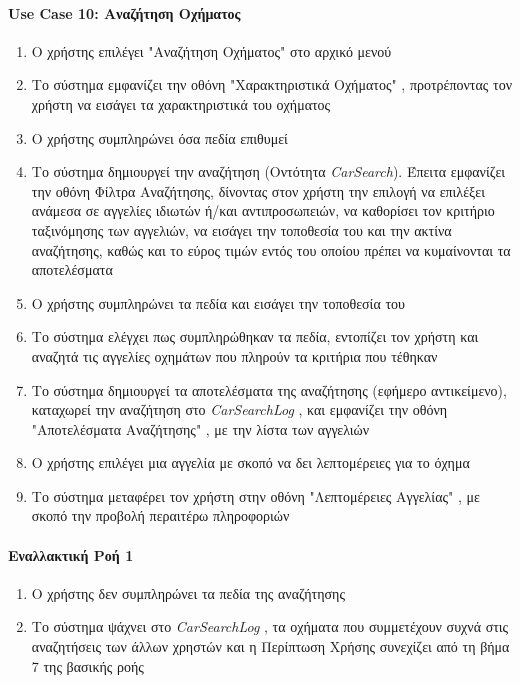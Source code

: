 \documentclass{../ol-softwaremanual}
\begin{document}
	\paragraph{\en Use Case 10: \gr Αναζήτηση Οχήματος}  
	\begin{enumerate}
		\item Ο χρήστης επιλέγει \en"\gr Αναζήτηση Οχήματος\en" \gr στο αρχικό μενού
		\item Το σύστημα εμφανίζει την οθόνη \en"\gr Χαρακτηριστικά Οχήματος\en" \gr, προτρέποντας τον χρήστη να εισάγει τα χαρακτηριστικά του οχήματος 
		\item Ο χρήστης συμπληρώνει όσα πεδία επιθυμεί
		\item Το σύστημα δημιουργεί την αναζήτηση (Οντότητα \en \textit{CarSearch}\gr). Έπειτα εμφανίζει την οθόνη Φίλτρα Αναζήτησης, δίνοντας στον χρήστη την επιλογή να επιλέξει ανάμεσα σε αγγελίες ιδιωτών ή/και αντιπροσωπειών, να καθορίσει τον κριτήριο ταξινόμησης των αγγελιών, να εισάγει την τοποθεσία του και την ακτίνα αναζήτησης, καθώς και το εύρος τιμών εντός του οποίου πρέπει να κυμαίνονται τα αποτελέσματα
		\item Ο χρήστης συμπληρώνει τα πεδία και εισάγει την τοποθεσία του 
		\item Το σύστημα ελέγχει πως συμπληρώθηκαν τα πεδία, εντοπίζει τον χρήστη και αναζητά τις αγγελίες οχημάτων που πληρούν τα κριτήρια που τέθηκαν		
		\item Το σύστημα δημιουργεί τα αποτελέσματα της αναζήτησης (εφήμερο αντικείμενο), καταχωρεί την αναζήτηση στο \en \textit{CarSearchLog} \gr, και εμφανίζει την οθόνη \en"\gr Αποτελέσματα Αναζήτησης\en" \gr, με την λίστα των αγγελιών 
		\item Ο χρήστης επιλέγει μια αγγελία με σκοπό να δει λεπτομέρειες για το όχημα
		\item Το σύστημα μεταφέρει τον χρήστη στην οθόνη \en"\gr Λεπτομέρειες Αγγελίας\en" \gr, με σκοπό την προβολή περαιτέρω πληροφοριών	
	\end{enumerate}
	
	
	\paragraph{Εναλλακτική Ροή 1}
	\begin{enumerate}
			\item Ο χρήστης δεν συμπληρώνει τα πεδία της αναζήτησης
			\item Το σύστημα ψάχνει στο \en \textit{CarSearchLog} \gr, τα οχήματα που συμμετέχουν συχνά στις αναζητήσεις των άλλων χρηστών και η Περίπτωση Χρήσης συνεχίζει από τη βήμα 7 της βασικής ροής
	\end{enumerate}
		
\end{document}
